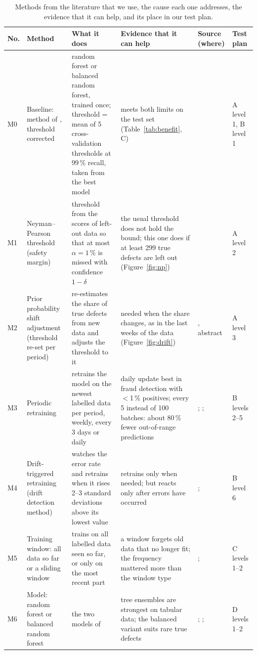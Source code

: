 \documentclass[11pt,a4paper]{article}
\begin{document}
\begin{table}[H]
\centering\small
\caption{Methods from the literature that we use, the cause each one addresses, the evidence that it can help, and its place in our test plan.}
\label{tab:methodlist}
\begin{tabularx}{\textwidth}{@{}p{0.5cm}p{2.6cm}LLp{2.2cm}p{1.6cm}@{}}
\toprule
No. & Method & What it does & Evidence that it can help & Source (where) & Test plan \\
\midrule
M0 & Baseline: method of \cite{pfab2025}, threshold corrected & random forest or balanced random forest, trained once; threshold = mean of 5 cross-validation thresholds at 99\,\% recall, taken from the best model & meets both limits on the test set (Table~\ref{tab:benefit}, C) & \cite[p.~3, Sec.~IV]{pfab2025} & A level 1, B level 1 \\
\midrule
M1 & Neyman--Pearson threshold (safety margin) & threshold from the scores of left-out data so that at most $\alpha = 1\,\%$ is missed with confidence $1-\delta$ & the usual threshold does not hold the bound; this one does if at least 299 true defects are left out (Figure~\ref{fig:np}) & \cite[p.~2, p.~7]{tong2018} & A level 2 \\
M2 & Prior probability shift adjustment (threshold re-set per period) & re-estimates the share of true defects from new data and adjusts the threshold to it & needed when the share changes, as in the last weeks of the data (Figure~\ref{fig:drift}) & \cite{saerens2002}, abstract & A level 3 \\
\midrule
M3 & Periodic retraining & retrains the model on the newest labelled data per period, weekly, every 3 days or daily & daily update best in fraud detection with $<$1\,\% positives; every 5 instead of 100 batches: about 80\,\% fewer out-of-range predictions & \cite{gama2014}; \cite[pp.~4--5, 13--14]{dalpozzolo2018}; \cite[p.~9]{gao2026} & B levels 2--5 \\
M4 & Drift-triggered retraining (drift detection method) & watches the error rate and retrains when it rises 2--3 standard deviations above its lowest value & retrains only when needed; but reacts only after errors have occurred & \cite[p.~4, Sec.~3]{gama2004}; \cite[p.~13]{gao2026} & B level 6 \\
M5 & Training window: all data so far or a sliding window & trains on all labelled data seen so far, or only on the most recent part & a window forgets old data that no longer fit; the frequency mattered more than the window type & \cite{gama2014}; \cite[p.~9]{gao2026} & C levels 1--2 \\
\midrule
M6 & Model: random forest or balanced random forest & the two models of \cite{pfab2025} & tree ensembles are strongest on tabular data; the balanced variant suits rare true defects & \cite[p.~1]{grinsztajn2022}; \cite{breiman2001}; \cite[pp.~2--3]{chen2004} & D levels 1--2 \\
\bottomrule
\end{tabularx}
\end{table}
\end{document}
